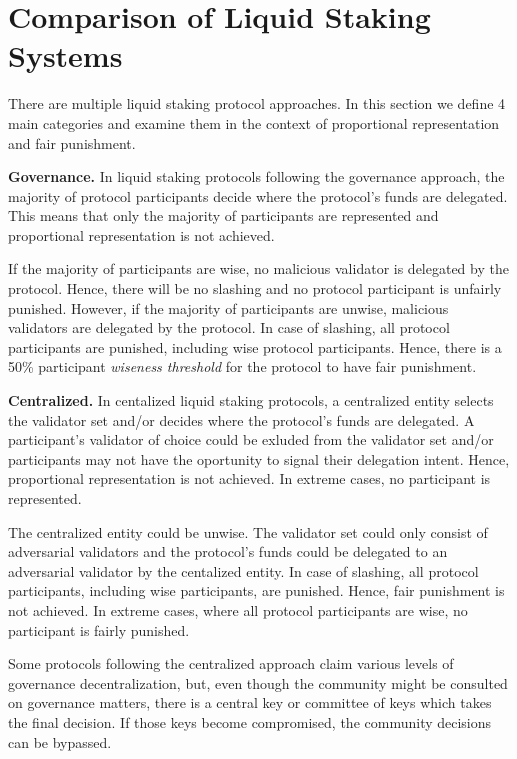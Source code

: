 \section{Comparison of Liquid Staking Systems}

There are multiple liquid staking protocol approaches. In this section we
define 4 main categories and examine them in the context of proportional
representation and fair punishment.

\textbf{Governance.}
In liquid staking protocols following the governance approach,
the majority of protocol participants decide where the protocol's
funds are delegated. This means that only the majority of participants
are represented and proportional representation is not achieved.

If the majority of participants are wise, no malicious validator is
delegated by the protocol. Hence, there will be no slashing and no
protocol participant is unfairly punished.
However, if the majority of participants are unwise, malicious validators
are delegated by the protocol. In case of slashing, all protocol participants
are punished, including wise protocol participants.
Hence, there is a 50\% participant \emph{wiseness threshold} for the protocol
to have fair punishment.

\textbf{Centralized.}
In centalized liquid staking protocols, a centralized entity
selects the validator set and/or decides where the protocol's funds
are delegated. A participant's validator of choice could be exluded from
the validator set and/or participants may not have the oportunity to signal
their delegation intent. Hence, proportional representation is not
achieved. In extreme cases, no participant is represented.

The centralized entity could be unwise. The validator set could only
consist of adversarial validators and the protocol's funds could be delegated
to an adversarial validator by the centalized entity. In case of slashing,
all protocol participants, including wise participants, are punished.
Hence, fair punishment is not achieved. In extreme cases, where all
protocol participants are wise, no participant is fairly punished.

Some protocols following the centralized approach claim various levels of
governance decentralization, but, even though the community might be consulted
on governance matters, there is a central key or committee of keys which takes
the final decision. If those keys become compromised, the community decisions
can be bypassed.

